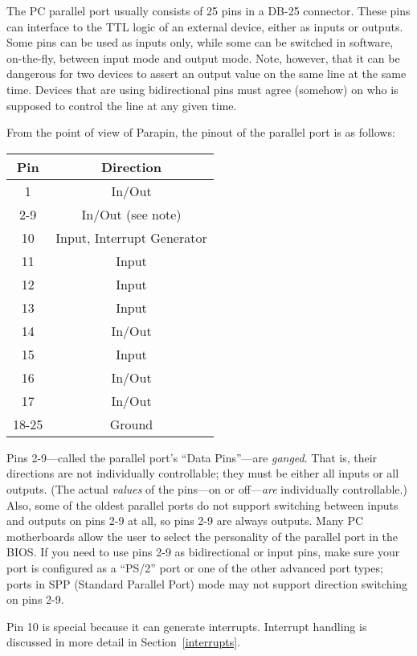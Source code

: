 \documentclass{article}
\begin{document}
The PC parallel port usually consists of 25 pins in a DB-25 connector.
These pins can interface to the TTL logic of an external device,
either as inputs or outputs.  Some pins can be used as inputs only,
while some can be switched in software, on-the-fly, between input mode
and output mode.  Note, however, that it can be dangerous for two
devices to assert an output value on the same line at the same time.
Devices that are using bidirectional pins must agree (somehow) on who
is supposed to control the line at any given time.

From the point of view of Parapin, the pinout of the parallel port is
as follows:

\begin{center}
\begin{tabular}{|c|c|}
\hline
Pin  &  Direction \\
\hline
1 & In/Out \\
\hline
2-9 & In/Out (see note) \\
\hline
10 & Input, Interrupt Generator \\
\hline
11 & Input \\
\hline
12 & Input \\
\hline
13 & Input \\
\hline
14 & In/Out \\
\hline
15 & Input \\
\hline
16 & In/Out \\
\hline
17 & In/Out \\
\hline
18-25 & Ground \\
\hline
\end{tabular}
\end{center}

Pins 2-9---called the parallel port's ``Data Pins''---are {\em
ganged}.  That is, their directions are not individually controllable;
they must be either all inputs or all outputs.  (The actual {\em
values} of the pins---on or off---{\em are} individually
controllable.)  Also, some of the oldest parallel ports do not support
switching between inputs and outputs on pins 2-9 at all, so pins 2-9
are always outputs.  Many PC motherboards allow the user to select the
personality of the parallel port in the BIOS.  If you need to use pins
2-9 as bidirectional or input pins, make sure your port is configured
as a ``PS/2'' port or one of the other advanced port types; ports in
SPP (Standard Parallel Port) mode may not support direction switching
on pins 2-9.

Pin 10 is special because it can generate interrupts.  Interrupt
handling is discussed in more detail in Section~\ref{interrupts}.
\end{document}
